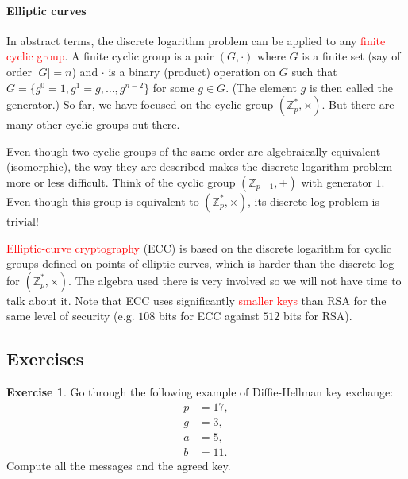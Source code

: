 \documentclass[a4paper, 11pt, openany]{book}
\numberwithin{equation}{section}
\theoremstyle{plain}
\theoremstyle{definition}
\newtheorem{exercise}   {Exercise}  [section]
\newcommand{\Z}{\mathbb{Z}}
\newcommand{\Important}[1]{\textcolor{red}{#1}}
\begin{document}
\paragraph{Elliptic curves}
In abstract terms, the discrete logarithm problem can be applied to any \Important{finite cyclic group}. A finite cyclic group is a pair $(G,\cdot)$ where $G$ is a finite set (say of order $|G| = n$) and $\cdot$ is a binary (product) operation on $G$ such that $G = \{g^0 = 1, g^1 = g, \dots, g^{n-2} \}$ for some $g \in G$. (The element $g$ is then called the generator.) So far, we have focused on the cyclic group $(\Z_p^*, \times)$. But there are many other cyclic groups out there. 

Even though two cyclic groups of the same order are algebraically equivalent (isomorphic), the way they are described makes the discrete logarithm problem more or less difficult. Think of the cyclic group $(\Z_{p-1}, +)$ with generator $1$. Even though this group is equivalent to $(\Z_p^*, \times)$, its discrete log problem is trivial!

\Important{Elliptic-curve cryptography} (ECC) is based on the discrete logarithm for cyclic groups defined on points of elliptic curves, which is harder than the discrete log for $(\Z_p^*, \times)$. The algebra used there is very involved so we will not have time to talk about it. Note that ECC uses significantly \Important{smaller keys} than RSA for the same level of security (e.g. $108$ bits for ECC against $512$ bits for RSA).

\subsection{Exercises}

\begin{exercise}
Go through the following example of Diffie-Hellman key exchange:
\begin{align*}
    p &= 17,\\
    g &= 3,\\
    a &= 5,\\
    b &= 11.
\end{align*}
Compute all the messages and the agreed key.
\end{exercise}
\end{document}
